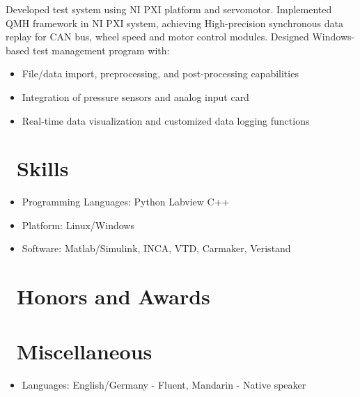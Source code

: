 \documentclass{resume}
\begin{document}

Developed test system using NI PXI platform and servomotor. Implemented QMH framework in NI PXI system, achieving High-precision synchronous data replay for CAN bus, wheel speed and motor control modules. Designed Windows-based test management program with:
\begin{itemize}
  \item File/data import, preprocessing, and post-processing capabilities
  \item Integration of pressure sensors and analog input card
  \item Real-time data visualization and customized data logging functions
\end{itemize}

\section{\faCogs\ Skills}
\begin{itemize}[parsep=0.5ex]
  \item Programming Languages: Python Labview C++
  \item Platform: Linux/Windows
  \item Software: Matlab/Simulink, INCA, VTD, Carmaker, Veristand 
\end{itemize}

\section{\faHeartO\ Honors and Awards}

\section{\faInfo\ Miscellaneous}
\begin{itemize}[parsep=0.5ex]
  \item Languages: English/Germany - Fluent, Mandarin - Native speaker
\end{itemize}

%
%
\end{document}
